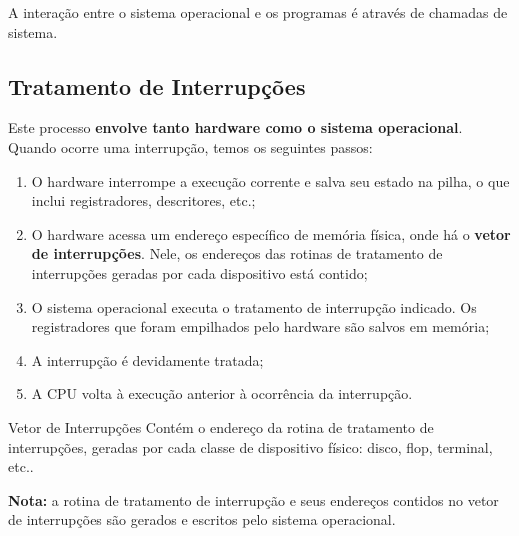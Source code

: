 A interação entre o sistema operacional e os programas é através de chamadas de sistema.



\subsection{Tratamento de Interrupções}

Este processo \textbf{envolve tanto hardware como o sistema operacional}. Quando ocorre uma interrupção, temos os seguintes passos:
\begin{enumerate}
  \item O hardware interrompe a execução corrente e salva seu estado na pilha, o que inclui registradores, descritores, etc.;

  \item O hardware acessa um endereço específico de memória física, onde há o \textbf{vetor de interrupções}. Nele, os endereços das rotinas de tratamento de interrupções geradas por cada dispositivo está contido;

  \item O sistema operacional executa o tratamento de interrupção indicado. Os registradores que foram empilhados pelo hardware são salvos em memória;

  \item A interrupção é devidamente tratada;

  \item A CPU volta à execução anterior à ocorrência da interrupção.
\end{enumerate}

\begin{definicao}{Vetor de Interrupções}
  Contém o endereço da rotina de tratamento de interrupções, geradas por cada classe de dispositivo físico: disco, flop, terminal, etc..
\end{definicao}


\textbf{Nota:} a rotina de tratamento de interrupção e seus endereços contidos no vetor de interrupções são gerados e escritos pelo sistema operacional.



















